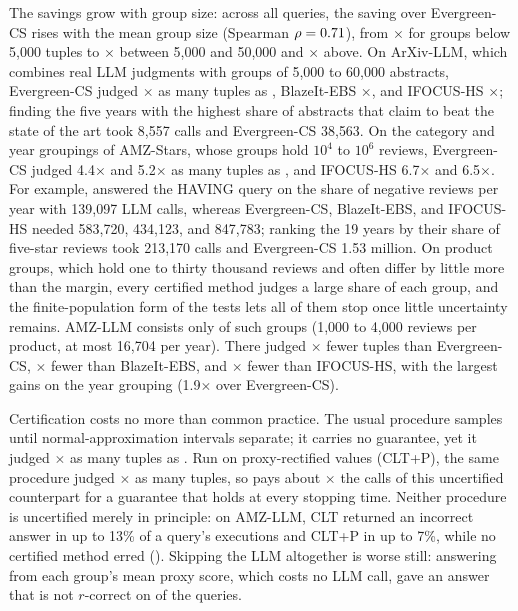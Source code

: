 The savings grow with group size: across all queries, the saving over Evergreen-CS rises with the mean group size (Spearman $\rho=0.71$), from \numBINA$\times$ for groups below 5{,}000 tuples to \numBINB$\times$ between 5{,}000 and 50{,}000 and \numBINC$\times$ above.
On ArXiv-LLM, which combines real LLM judgments with groups of 5{,}000 to 60{,}000 abstracts, Evergreen-CS judged \numAXRWSR$\times$ as many tuples as \sys{}, BlazeIt-EBS \numAXRBSP$\times$, and IFOCUS-HS \numAXRHS$\times$; finding the five years with the highest share of abstracts that claim to beat the state of the art took \sys{} 8{,}557 calls and Evergreen-CS 38{,}563.
On the category and year groupings of AMZ-Stars, whose groups hold $10^4$ to $10^6$ reviews, Evergreen-CS judged 4.4$\times$ and 5.2$\times$ as many tuples as \sys{}, and IFOCUS-HS 6.7$\times$ and 6.5$\times$.
For example, \sys{} answered the HAVING query on the share of negative reviews per year with 139{,}097 LLM calls, whereas Evergreen-CS, BlazeIt-EBS, and IFOCUS-HS needed 583{,}720, 434{,}123, and 847{,}783; ranking the 19 years by their share of five-star reviews took \sys{} 213{,}170 calls and Evergreen-CS 1.53 million.
On product groups, which hold one to thirty thousand reviews and often differ by little more than the margin, every certified method judges a large share of each group, and the finite-population form of the tests lets all of them stop once little uncertainty remains.
AMZ-LLM consists only of such groups (1{,}000 to 4{,}000 reviews per product, at most 16{,}704 per year).
There \sys{} judged \numAMZLRWSR$\times$ fewer tuples than Evergreen-CS, \numAMZLRBSP$\times$ fewer than BlazeIt-EBS, and \numAMZLRHS$\times$ fewer than IFOCUS-HS, with the largest gains on the year grouping (1.9$\times$ over Evergreen-CS).

Certification costs no more than common practice.
The usual procedure samples until normal-approximation intervals separate; it carries no guarantee, yet it judged \numRCLT$\times$ as many tuples as \sys{}.
Run on proxy-rectified values (CLT+P), the same procedure judged \numRCLTP$\times$ as many tuples, so \sys{} pays about \numRCLTPINV$\times$ the calls of this uncertified counterpart for a guarantee that holds at every stopping time.
Neither procedure is uncertified merely in principle: on AMZ-LLM, CLT returned an incorrect answer in up to 13\% of a query's executions and CLT+P in up to 7\%, while no certified method erred ().
Skipping the LLM altogether is worse still: answering from each group's mean proxy score, which costs no LLM call, gave an answer that is not $r$-correct on \numNPROXYWRONG{} of the \numNPROXYQ{} queries.

